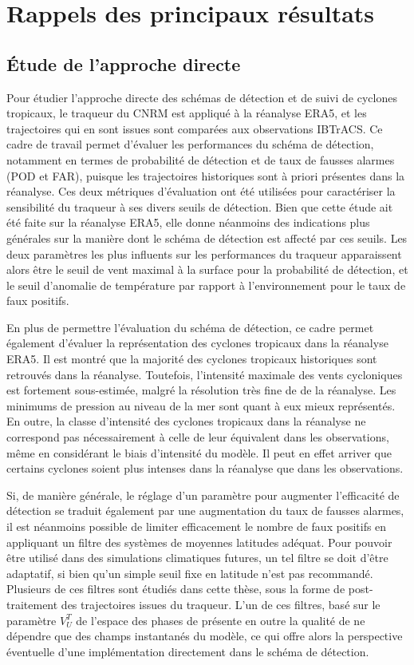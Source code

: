 \documentclass[../main.tex]{subfiles}
\begin{document}
\section*{Rappels des principaux résultats}

\subsection*{Étude de l'approche directe}

Pour étudier l'approche directe des schémas de détection et de suivi de cyclones tropicaux, le traqueur du CNRM est appliqué à la réanalyse ERA5, et les
trajectoires qui en sont issues sont comparées aux observations IBTrACS. Ce cadre de travail permet d'évaluer les performances du schéma de détection, notamment
en termes de probabilité de détection et de taux de fausses alarmes (POD et FAR), puisque les trajectoires historiques sont à priori présentes dans la
réanalyse. Ces deux métriques d'évaluation ont été utilisées pour caractériser la sensibilité du traqueur à ses divers seuils de détection. Bien que cette étude
ait été faite sur la réanalyse ERA5, elle donne néanmoins des indications plus générales sur la manière dont le schéma de détection est affecté par ces seuils.
Les deux paramètres les plus influents sur les performances du traqueur apparaissent alors être le seuil de vent maximal à la surface pour la probabilité de
détection, et le seuil d'anomalie de température par rapport à l'environnement pour le taux de faux positifs.

En plus de permettre l'évaluation du schéma de détection, ce cadre permet également d'évaluer la représentation des cyclones tropicaux dans la réanalyse ERA5.
Il est montré que la majorité des cyclones tropicaux historiques sont retrouvés dans la réanalyse. Toutefois, l'intensité maximale des vents cycloniques est
fortement sous-estimée, malgré la résolution très fine de  de la réanalyse. Les minimums de pression au niveau de la mer sont quant à eux mieux
représentés. En outre, la classe d'intensité des cyclones tropicaux dans la réanalyse ne correspond pas nécessairement à celle de leur équivalent dans les
observations, même en considérant le biais d'intensité du modèle. Il peut en effet arriver que certains cyclones soient plus intenses dans la réanalyse que dans
les observations.

Si, de manière générale, le réglage d'un paramètre pour augmenter l'efficacité de détection se traduit également par une augmentation du taux de fausses
alarmes, il est néanmoins possible de limiter efficacement le nombre de faux positifs en appliquant un filtre des systèmes de moyennes latitudes adéquat. Pour
pouvoir être utilisé dans des simulations climatiques futures, un tel filtre se doit d'être adaptatif, si bien qu'un simple seuil fixe en latitude n'est pas
recommandé. Plusieurs de ces filtres sont étudiés dans cette thèse, sous la forme de post-traitement des trajectoires issues du traqueur. L'un de ces filtres,
basé sur le paramètre $V_U^T$ de l'espace des phases de \textcite{hart_cyclone_2003} présente en outre la qualité de ne dépendre que des champs instantanés du
modèle, ce qui offre alors la perspective éventuelle d'une implémentation directement dans le schéma de détection.
\end{document}
